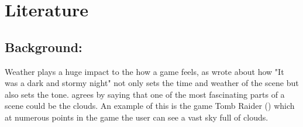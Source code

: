 \clearpage
\section{Literature}
\subsection{Background:}
Weather plays a huge impact to the how a game feels, as \citet{Barton08} wrote about how "It was a dark and stormy night" not only sets the time and weather of the scene but also sets the tone. \citet{NWang04} agrees by saying that one of the most fascinating parts of a scene could be the clouds. An example of this is the game Tomb Raider (\citeyear{TombRaider13}) which at numerous points in the game the user can see a vast sky full of clouds. 



